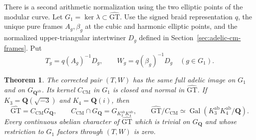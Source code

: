 \documentclass[11pt,a4paper]{article}
\newtheorem{theorem}{Theorem}[section]
\theoremstyle{definition}
\theoremstyle{remark}
\newcommand{\GT}{\widehat{\mathrm{GT}}}
\newcommand{\Q}{\mathbf Q}
\newcommand{\GQ}{G_{\Q}}
\newcommand{\ab}{\mathrm{ab}}
\DeclareMathOperator{\Gal}{Gal}
\begin{document}
There is a second arithmetic normalization using the two elliptic
points of the modular curve.  Let $G_1=\ker\lambda\subset\GT$.
Use the signed braid representation $q$, the unique pure frames
$A_g,\beta_g$ at the cubic and harmonic elliptic points, and the
normalized upper-triangular intertwiner $D_g$ defined in
Section~\ref{sec:adelic-cm-frames}.  Put
\[
 T_g=q(A_g)^{-1}D_g,\qquad W_g=q(\beta_g)^{-1}D_g
                       \quad(g\in G_1).
\]

\begin{theorem}\label{thm:main-cm-normalization}
The corrected pair $(T,W)$ has the same full adelic image on $G_1$
and on $G_{\Q^{\ab}}$.  Its kernel $C_{\mathrm{CM}}$ in $G_1$
is closed and normal in $\GT$.  If
$K_3=\Q(\sqrt{-3})$ and $K_4=\Q(i)$, then
\[
 \GT=C_{\mathrm{CM}}\GQ,\qquad
 C_{\mathrm{CM}}\cap\GQ=G_{K_3^{\ab}K_4^{\ab}},\qquad
 \GT/C_{\mathrm{CM}}\simeq
       \Gal(K_3^{\ab}K_4^{\ab}/\Q).
\]
Every continuous abelian character of $\GT$ which is trivial on
$\GQ$ and whose restriction to $G_1$ factors through $(T,W)$ is zero.
\end{theorem}
\end{document}
